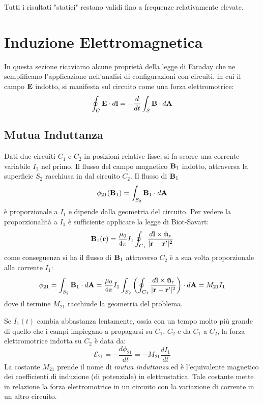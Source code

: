 Tutti i risultati "statici" restano validi fino a frequenze relativamente elevate.
 


\section{Induzione Elettromagnetica }

In questa sezione  ricaviamo alcune propriet\`a della legge di Faraday che ne semplificano l'applicazione nell'analisi di configurazioni con circuiti, in cui il campo $\bold{E}$ indotto, si manifesta sul circuito come una forza elettromotrice:
\begin{equation*}
	\oint_{C} \bold{E} \cdot d \bold{l} = - \frac{d}{dt} \int_{S} \bold{B} \cdot d \bold{A}
\end{equation*}
 
 \subsection{Mutua Induttanza}
 
 Dati due circuiti $C_1$ e $C_2$ in posizioni relative fisse, si fa scorre una corrente variabile $I_1 $ nel primo. Il flusso del campo magnetico $\bold{B}_1$ indotto, attraversa la superficie $S_2$ racchiusa in dal circuito $C_2$. Il flusso di $\bold{B}_1$
 \begin{equation*}
 	\phi_{21} (\bold{B}_1) = \int_{S_2}\bold{B}_1 \cdot d\bold{A} 
 \end{equation*}
 \`e proporzionale a $I_1$ e dipende dalla geometria del circuito. Per vedere la proporzionalit\`a a $I_1$ \`e sufficiente applicare la legge di Biot-Savart:
 \begin{equation*}
 	\bold{B}_1(\bold{r}) = \frac{\mu_0}{4 \pi}I_1 \oint_{C_1} \frac{d\bold{l} \times \hat{\bold{u}}_z}{|\bold{r} - \bold{r}'|^2}
 \end{equation*}
come conseguenza si ha il flusso di $\bold{B}_1$ attraverso $C_2$ \`e a sua volta proporzionale alla corrente $I_1$:
\begin{equation*}
	\phi_{21}  = \int_{S_2}\bold{B}_1 \cdot d \bold{A} = \frac{\mu_0}{4 \pi}I_1 \int_{S_2} \left(\oint_{C_1} \frac{d \bold{l} \times \bold{\hat{u}}_r}{|\bold{r} - \bold{r}'|^2}\right) \cdot d \bold{A} = M_{21}I_1
\end{equation*}
dove il termine $M_{21}$ racchiude la geometria del problema.

Se $I_1(t)$ cambia abbastanza lentamente, ossia con un tempo molto pi\`u grande di quello che i campi impiegano a propagarsi su $C_1$, $C_2$ e da $C_1$ a $C_2$, la forza elettromotrice indotta su $C_2$ \`e data da:
\begin{equation}
	\mathcal{E}_{21} = - \frac{d\phi_{21}}{dt} = -M_{21} \frac{dI_1}{dt}
\end{equation}
La costante $M_{21}$ prende il nome di \textit{mutua induttanza} ed \`e l'equivalente magnetico dei coefficienti di induzione (di potenziale) in elettrostatica. Tale costante mette in relazione la forza elettromotrice in un circuito con la variazione di corrente in un altro circuito.
\newline


